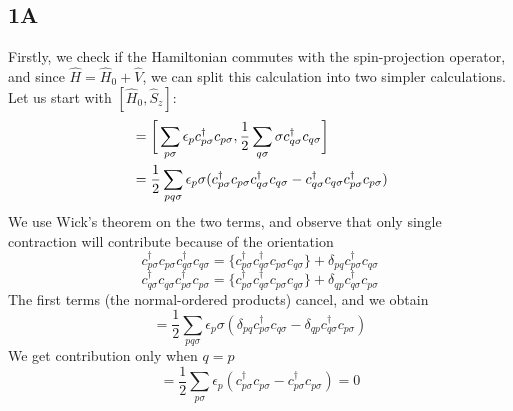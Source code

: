 \documentclass[norsk,a4paper,12pt]{article}
\begin{document}
\subsection*{1A}
Firstly, we check if the Hamiltonian commutes with the spin-projection operator, and since $\hat{H}=\hat{H}_0+\hat{V}$, we can split this calculation into two simpler calculations. Let us start with $[\hat{H}_0,\hat{S}_z]$:
\begin{align}
[\hat{H}_0,\hat{S}_z]&=\bigg[\sum_{p\sigma}\epsilon_pc_{p\sigma}^{\dagger}c_{p\sigma},\frac{1}{2}\sum_{q\sigma}\sigma c_{q\sigma}^{\dagger}c_{q\sigma}\bigg]\notag\\
&=\frac{1}{2}\sum_{pq\sigma}\epsilon_{p}\sigma(c_{p\sigma}^{\dagger}c_{p\sigma}c_{q\sigma}^{\dagger}c_{q\sigma}-c_{q\sigma}^{\dagger}c_{q\sigma}c_{p\sigma}^{\dagger}c_{p\sigma})
\end{align}
We use Wick's theorem on the two terms, and observe that only single contraction will contribute because of the orientation
\begin{equation}
c_{p\sigma}^{\dagger}c_{p\sigma}c_{q\sigma}^{\dagger}c_{q\sigma}=\{c_{p\sigma}^{\dagger}c_{q\sigma}^{\dagger}c_{p\sigma}c_{q\sigma}\}+\delta_{pq}c_{p\sigma}^{\dagger}c_{q\sigma}
\end{equation}
\begin{equation}
c_{q\sigma}^{\dagger}c_{q\sigma}c_{p\sigma}^{\dagger}c_{p\sigma}=\{c_{p\sigma}^{\dagger}c_{q\sigma}^{\dagger}c_{p\sigma}c_{q\sigma}\}+\delta_{qp}c_{q\sigma}^{\dagger}c_{p\sigma}
\end{equation}
The first terms (the normal-ordered products) cancel, and we obtain
\begin{equation}
[\hat{H}_0,\hat{S}_z]=\frac{1}{2}\sum_{pq\sigma}\epsilon_p\sigma(\delta_{pq}c_{p\sigma}^{\dagger}c_{q\sigma}-\delta_{qp}c_{q\sigma}^{\dagger}c_{p\sigma})
\end{equation}
We get contribution only when $q=p$
\begin{equation}
[\hat{H}_0,\hat{S}_z]=\frac{1}{2}\sum_{p\sigma}\epsilon_p(c_{p\sigma}^{\dagger}c_{p\sigma}-c_{p\sigma}^{\dagger}c_{p\sigma})=0
\end{equation}
\end{document}
